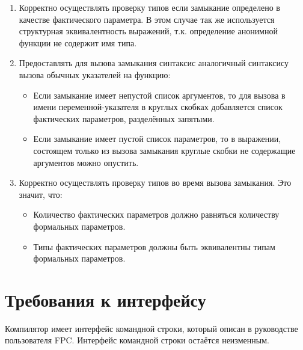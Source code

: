 \documentclass{imcs}
\begin{document}
\begin{enumerate}

        
      \item Корректно осуществлять проверку типов если замыкание определено в качестве фактического параметра.
В этом случае так же используется структурная эквивалентность выражений, т.к. определение анонимной функции не
содержит имя типа.

        
    \item Предоставлять для вызова замыкания синтаксис аналогичный синтаксису вызова обычных указателей
 на функцию:
        \begin{itemize}
          \item Если замыкание имеет непустой список аргументов, то для вызова в имени переменной-указателя
в круглых скобках добавляется список фактических параметров, разделённых запятыми.
          \item Если замыкание имеет пустой список параметров, то в выражении, состоящем только из вызова
замыкания круглые скобки не содержащие аргументов можно опустить.

        \end{itemize}
        
  \item Корректно осуществлять проверку типов во время вызова замыкания. Это значит, что:
        \begin{itemize}
          \item Количество фактических параметров должно равняться количеству формальных параметров.
          \item Типы фактических параметров должны быть эквивалентны типам формальных параметров.
        \end{itemize}

    
\end{enumerate}


\section{Требования к интерфейсу}

Компилятор имеет интерфейс командной строки, который описан
в руководстве пользователя FPC\cite{userguide}. Интерфейс командной строки остаётся неизменным.

\end{document}
